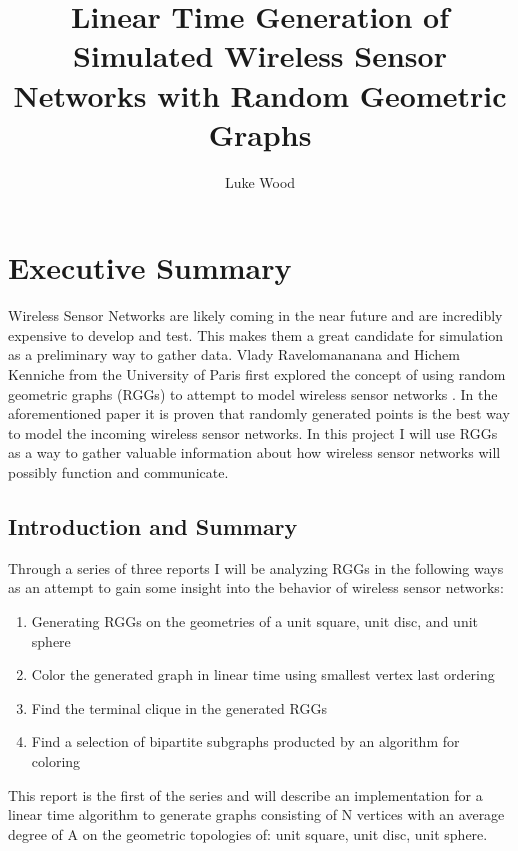 \documentclass{article}
\begin{document}
  \title{Linear Time Generation of Simulated Wireless Sensor Networks with Random Geometric Graphs}
  \author{Luke Wood}
  \maketitle

  \section{Executive Summary}
	Wireless Sensor Networks are likely coming in the near future and are incredibly expensive to develop and test.
	This makes them a great candidate for simulation as a preliminary way to gather data.
	Vlady Ravelomananana and Hichem Kenniche from the University of Paris first explored the concept of using random geometric graphs (RGGs) to attempt to model wireless sensor networks \cite{kenniche2010random}.
	In the aforementioned paper it is proven that randomly generated points is the best way to model the incoming wireless sensor networks.
	In this project I will use RGGs as a way to gather valuable information about how wireless sensor networks will possibly function and communicate.

  \subsection{Introduction and Summary}
	Through a series of three reports	I will be analyzing RGGs in the following ways as an attempt to gain some insight into the behavior of wireless sensor networks:
	\begin{enumerate}
		\item Generating RGGs on the geometries of a unit square, unit disc, and unit sphere
		\item Color the generated graph in linear time using smallest vertex last ordering
		\item Find the terminal clique in the generated RGGs
		\item Find a selection of bipartite subgraphs producted by an algorithm for coloring
	\end{enumerate}
	This report is the first of the series and  will describe an implementation for a linear time algorithm to generate graphs consisting of N vertices with an average degree of A on the geometric topologies of: unit square, unit disc, unit sphere.
\end{document}
